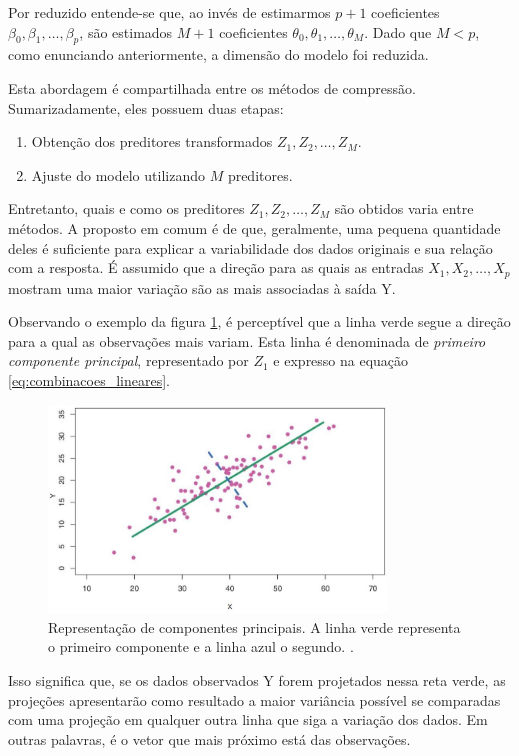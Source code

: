 Por reduzido entende-se que, ao invés de estimarmos $p+1$ coeficientes $\beta_0,\beta_1,\dots,\beta_p$, são estimados $M+1$ coeficientes $\theta_0,\theta_1,\dots,\theta_M$. Dado que $M<p$, como enunciando anteriormente, a dimensão do modelo foi reduzida.

Esta abordagem é compartilhada entre os métodos de compressão. Sumarizadamente, eles possuem duas etapas:
\begin{enumerate}
	\item Obtenção dos preditores transformados $Z_1,Z_2,\dots,Z_M$.
	\item Ajuste do modelo utilizando $M$ preditores.
\end{enumerate}
Entretanto, quais e como os preditores $Z_1,Z_2,\dots,Z_M$ são obtidos varia entre métodos. A proposto em comum é de que, geralmente, uma pequena quantidade deles é suficiente para explicar a variabilidade dos dados originais e sua relação com a resposta. É assumido que a direção para as quais as entradas $X_1,X_2,\dots,X_p$ mostram uma maior variação são as mais associadas à saída Y.

Observando o exemplo da figura \ref{figure:principal_component}, é perceptível que a linha verde segue a direção para a qual as observações mais variam. Esta linha é denominada de \textit{primeiro componente principal}, representado por $Z_1$ e expresso na equação \ref{eq:combinacoes_lineares}.

\begin{figure}[H]
	\center
	\includegraphics[width=0.8\textwidth]{images/principal_component}
	\caption{Representação de componentes principais. A linha verde representa o primeiro componente e a linha azul o segundo. \cite{James2013}.} 
	\label{figure:principal_component}
\end{figure}

Isso significa que, se os dados observados Y forem projetados nessa reta verde, as projeções apresentarão como resultado a maior variância possível se comparadas com uma projeção em qualquer outra linha que siga a variação dos dados. Em outras palavras, é o vetor que mais próximo está das observações.

